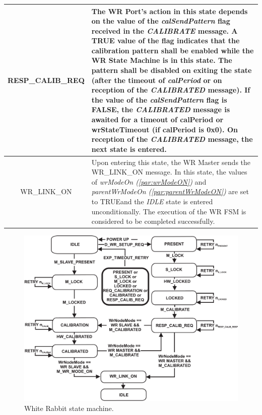 \documentclass[a4paper, 12pt]{article}
\begin{document}
\begin{table}[hp!]
\begin{tabular}{| c | p{12.2cm} |}
RESP\_CALIB\_REQ   &  The WR Port's action in this state depends on the value of the 
		      \textit{calSendPattern} flag received in the \textit{CALIBRATE} 
		      message. A TRUE value of the flag
		      indicates that the calibration pattern shall be enabled while the WR State 
		      Machine is in this state. The pattern shall  be
		      disabled on exiting the state (after the timeout of \textit{calPeriod} or 
		      on reception of the \textit{CALIBRATED} message). If the value of  the
		      \textit{calSendPattern} flag is FALSE, 
		      the \textit{CALIBRATED} message is awaited for a timeout of calPeriod or 
		      wrStateTimeout (if calPeriod is 0x0). On 
		      reception of the \textit{CALIBRATED} message, the next state is entered.\\
		      \hline
WR\_LINK\_ON       &  Upon entering this state, the WR Master sends the WR\_LINK\_ON message. 
		      In this state, the values of \textit{wrModeOn (\ref{par:wrModeON})} and 
		      \textit{parentWrModeOn (\ref{par:parentWrModeON})} are set to 
		      TRUE\footnotemark[6] and the \textit{IDLE}  state is entered unconditionally. 
		      The execution of the WR FSM is considered to be completed successfully. \\ \hline
\end{tabular}
\label{tab:wrFSMdesc}
\end{table}


\addtocounter{footnote}{1}

\begin{figure}[ht!]
  \centering
  \includegraphics[width=1.00\textwidth]{protocol/wrFSM.pdf}
  \caption{White Rabbit state machine.}
  \label{fig:wrFSM}
\end{figure}
\end{document}
